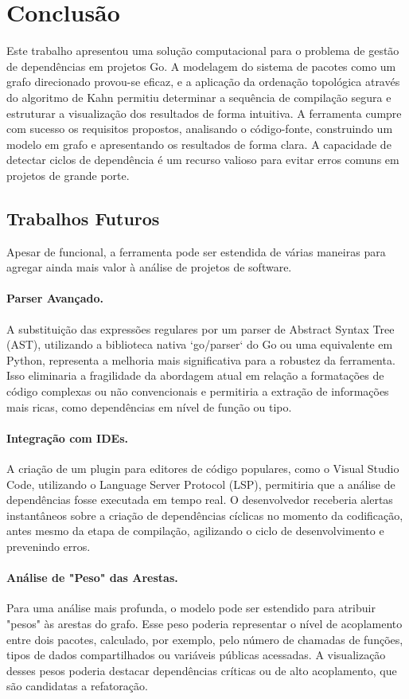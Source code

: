 \documentclass[12pt]{article}
\begin{document}
\section{Conclusão}
Este trabalho apresentou uma solução computacional para o problema de gestão de dependências em projetos Go. A modelagem do sistema de pacotes como um grafo direcionado provou-se eficaz, e a aplicação da ordenação topológica através do algoritmo de Kahn \cite{kahn1962} permitiu determinar a sequência de compilação segura e estruturar a visualização dos resultados de forma intuitiva. A ferramenta cumpre com sucesso os requisitos propostos, analisando o código-fonte, construindo um modelo em grafo e apresentando os resultados de forma clara. A capacidade de detectar ciclos de dependência é um recurso valioso para evitar erros comuns em projetos de grande porte.

\subsection{Trabalhos Futuros}
Apesar de funcional, a ferramenta pode ser estendida de várias maneiras para agregar ainda mais valor à análise de projetos de software.

\paragraph{Parser Avançado.} A substituição das expressões regulares por um parser de Abstract Syntax Tree (AST), utilizando a biblioteca nativa `go/parser` do Go ou uma equivalente em Python, representa a melhoria mais significativa para a robustez da ferramenta. Isso eliminaria a fragilidade da abordagem atual em relação a formatações de código complexas ou não convencionais e permitiria a extração de informações mais ricas, como dependências em nível de função ou tipo.

\paragraph{Integração com IDEs.} A criação de um plugin para editores de código populares, como o Visual Studio Code, utilizando o Language Server Protocol (LSP), permitiria que a análise de dependências fosse executada em tempo real. O desenvolvedor receberia alertas instantâneos sobre a criação de dependências cíclicas no momento da codificação, antes mesmo da etapa de compilação, agilizando o ciclo de desenvolvimento e prevenindo erros.

\paragraph{Análise de "Peso" das Arestas.} Para uma análise mais profunda, o modelo pode ser estendido para atribuir "pesos" às arestas do grafo. Esse peso poderia representar o nível de acoplamento entre dois pacotes, calculado, por exemplo, pelo número de chamadas de funções, tipos de dados compartilhados ou variáveis públicas acessadas. A visualização desses pesos poderia destacar dependências críticas ou de alto acoplamento, que são candidatas a refatoração.
\end{document}

